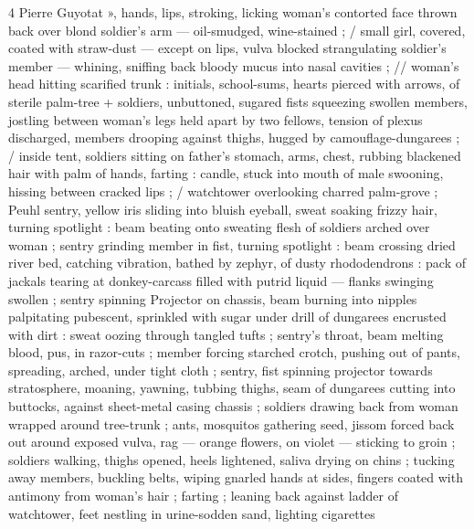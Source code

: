 4 Pierre Guyotat
», hands, lips, stroking, licking woman's contorted face thrown back
over blond soldier's arm — oil-smudged, wine-stained ; / small girl,
covered, coated with straw-dust — except on lips, vulva blocked
strangulating soldier's member — whining, sniffing back bloody
mucus into nasal cavities ; // woman's head hitting scarified trunk :
initials, school-sums, hearts pierced with arrows, of sterile palm-tree
+ soldiers, unbuttoned, sugared fists squeezing swollen members,
jostling between woman's legs held apart by two fellows, tension of
plexus discharged, members drooping against thighs, hugged by
camouflage-dungarees ; / inside tent, soldiers sitting on father's
stomach, arms, chest, rubbing blackened hair with palm of hands,
farting : candle, stuck into mouth of male swooning, hissing between
cracked lips ; / watchtower overlooking charred palm-grove ; Peuhl
sentry, yellow iris sliding into bluish eyeball, sweat soaking frizzy
hair, turning spotlight : beam beating onto sweating flesh of soldiers
arched over woman ; sentry grinding member in fist, turning spotlight
: beam crossing dried river bed, catching vibration, bathed by zephyr,
of dusty rhododendrons : pack of jackals tearing at donkey-carcass
filled with putrid liquid — flanks swinging swollen ; sentry spinning
Projector on chassis, beam burning into nipples palpitating
pubescent, sprinkled with sugar under drill of dungarees encrusted
with dirt : sweat oozing through tangled tufts ; sentry's throat, beam
melting blood, pus, in razor-cuts ; member forcing starched crotch,
pushing out of pants, spreading, arched, under tight cloth ; sentry,
fist spinning projector towards stratosphere, moaning, yawning,
tubbing thighs, seam of dungarees cutting into buttocks, against
sheet-metal casing chassis ; soldiers drawing back from woman
wrapped around tree-trunk ; ants, mosquitos gathering seed, jissom
forced back out around exposed vulva, rag — orange flowers, on
violet — sticking to groin ; soldiers walking, thighs opened, heels
lightened, saliva drying on chins ; tucking away members, buckling
belts, wiping gnarled hands at sides, fingers coated with antimony
from woman's hair ; farting ; leaning back against ladder of
watchtower, feet nestling in urine-sodden sand, lighting cigarettes

